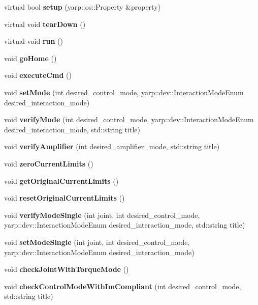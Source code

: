 \begin{DoxyCompactItemize}
\item 
\mbox{\label{classControlModes_a906098cdeee49ee608ec27e14d17fe4a}} 
virtual bool {\bfseries setup} (yarp\+::os\+::\+Property \&property)
\item 
\mbox{\label{classControlModes_a96e49aa347dc1a743e5f506672f72dc5}} 
virtual void {\bfseries tear\+Down} ()
\item 
\mbox{\label{classControlModes_ae438acaf6677471f962d3d6eec430b52}} 
virtual void {\bfseries run} ()
\item 
\mbox{\label{classControlModes_aba99419a0f329ef8db34b3247c9e8461}} 
void {\bfseries go\+Home} ()
\item 
\mbox{\label{classControlModes_a499fb7c42dc501895e41fb8e7922f3fb}} 
void {\bfseries execute\+Cmd} ()
\item 
\mbox{\label{classControlModes_a2db54b3f482b49317a73caffba85fe98}} 
void {\bfseries set\+Mode} (int desired\+\_\+control\+\_\+mode, yarp\+::dev\+::\+Interaction\+Mode\+Enum desired\+\_\+interaction\+\_\+mode)
\item 
\mbox{\label{classControlModes_a0fd65934486cb3b04051457157588da0}} 
void {\bfseries verify\+Mode} (int desired\+\_\+control\+\_\+mode, yarp\+::dev\+::\+Interaction\+Mode\+Enum desired\+\_\+interaction\+\_\+mode, std\+::string title)
\item 
\mbox{\label{classControlModes_a8a5254839c70e03ba027506e84ccde96}} 
void {\bfseries verify\+Amplifier} (int desired\+\_\+amplifier\+\_\+mode, std\+::string title)
\item 
\mbox{\label{classControlModes_af8d034ed81bad265bef55868c93dccbb}} 
void {\bfseries zero\+Current\+Limits} ()
\item 
\mbox{\label{classControlModes_a07b40de5590b6de6465275f120cc0278}} 
void {\bfseries get\+Original\+Current\+Limits} ()
\item 
\mbox{\label{classControlModes_a4829a8e1d1d0a9bc97d6f99a39f200fb}} 
void {\bfseries reset\+Original\+Current\+Limits} ()
\item 
\mbox{\label{classControlModes_a2f143308636985ca5e9b54886d88ab37}} 
void {\bfseries verify\+Mode\+Single} (int joint, int desired\+\_\+control\+\_\+mode, yarp\+::dev\+::\+Interaction\+Mode\+Enum desired\+\_\+interaction\+\_\+mode, std\+::string title)
\item 
\mbox{\label{classControlModes_af9a2fe5d8cdeba9c6a4c6419b7e10c26}} 
void {\bfseries set\+Mode\+Single} (int joint, int desired\+\_\+control\+\_\+mode, yarp\+::dev\+::\+Interaction\+Mode\+Enum desired\+\_\+interaction\+\_\+mode)
\item 
\mbox{\label{classControlModes_a5a886c22a344441ff40d7223b1a9b7aa}} 
void {\bfseries check\+Joint\+With\+Torque\+Mode} ()
\item 
\mbox{\label{classControlModes_a7711d4bf20776b36e5707d04d7919250}} 
void {\bfseries check\+Control\+Mode\+With\+Im\+Compliant} (int desired\+\_\+control\+\_\+mode, std\+::string title)
\end{DoxyCompactItemize}


